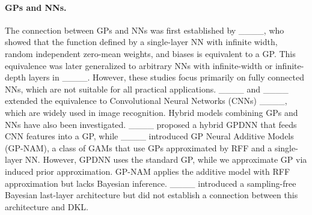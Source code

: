 \paragraph{GPs and NNs.}
The connection between GPs and NNs was first established by ____, who showed that the function defined by a single-layer NN with infinite width, random independent zero-mean weights, and biases is equivalent to a GP. This equivalence was later generalized to arbitrary NNs with infinite-width or infinite-depth layers in ____. However, these studies focus primarily on fully connected NNs, which are not suitable for all practical applications. ____ and ____ extended the equivalence to Convolutional Neural Networks (CNNs) ____, which are widely used in image recognition. Hybrid models combining GPs and NNs have also been investigated. ____ proposed a hybrid GPDNN that feeds CNN features into a GP, while ____ introduced GP Neural Additive Models (GP-NAM), a class of GAMs that use GPs approximated by RFF and a single-layer NN. However, GPDNN uses the standard GP, while we approximate GP via induced prior approximation. GP-NAM applies the additive model with RFF approximation but lacks Bayesian inference. ____ introduced a sampling-free Bayesian last-layer architecture but did not establish a connection between this architecture and DKL. %
